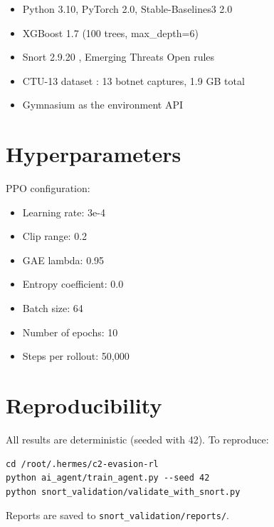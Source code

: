 \documentclass[12pt,a4paper]{report}
\begin{document}
\begin{itemize}
  \item Python 3.10, PyTorch 2.0, Stable-Baselines3 2.0 \cite{stable_baselines3}
  \item XGBoost 1.7 (100 trees, max\_depth=6) \cite{chen2016xgboost}
  \item Snort 2.9.20 \cite{snort_project}, Emerging Threats Open rules \cite{emerging_threats}
  \item CTU-13 dataset \cite{stratosphere_ctu13}: 13 botnet captures, 1.9 GB total
  \item Gymnasium as the environment API \cite{gymnasium}
\end{itemize}

\section{Hyperparameters}

PPO configuration:
\begin{itemize}
  \item Learning rate: 3e-4
  \item Clip range: 0.2
  \item GAE lambda: 0.95
  \item Entropy coefficient: 0.0
  \item Batch size: 64
  \item Number of epochs: 10
  \item Steps per rollout: 50,000
\end{itemize}

\section{Reproducibility}

All results are deterministic (seeded with 42). To reproduce:

\begin{verbatim}
cd /root/.hermes/c2-evasion-rl
python ai_agent/train_agent.py --seed 42
python snort_validation/validate_with_snort.py
\end{verbatim}

Reports are saved to \texttt{snort\_validation/reports/}.
\end{document}
